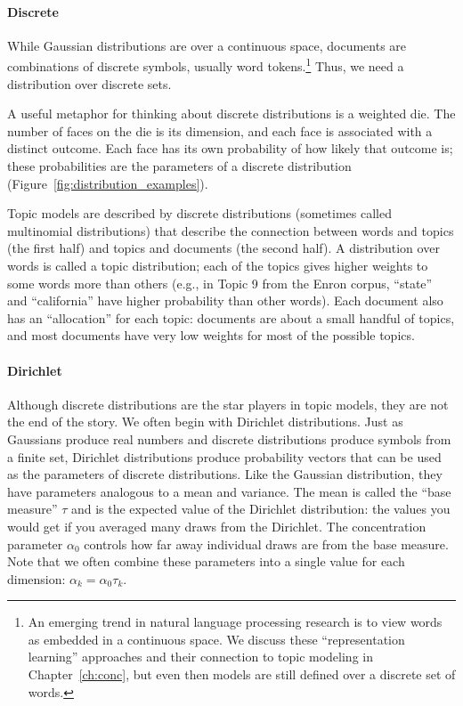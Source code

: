 \paragraph{Discrete}

While Gaussian distributions are over a continuous space, documents are
combinations of discrete symbols, usually word tokens.\footnote{An emerging trend in natural language
  processing research is to view words as embedded in a continuous space. We
  discuss these ``representation learning'' approaches and their connection to
  topic modeling in Chapter~\ref{ch:conc}, but even then models are still defined over a discrete set of words.}   Thus, we need a distribution
over discrete sets.

A useful metaphor for thinking about discrete distributions is a weighted die.
The number of faces on the die is its dimension, and each face is associated with a distinct
outcome.  Each face has its own probability of how likely that outcome is;
these probabilities are the parameters of a discrete distribution
(Figure~\ref{fig:distribution_examples}).

Topic models are described by discrete distributions (sometimes called
multinomial distributions) that describe the connection between words and topics (the first half) and topics and documents (the second half).  A distribution
over words is called a topic distribution; each of the topics gives
higher weights to some words more than others (e.g., in Topic 9 from
the Enron corpus, ``state'' and ``california'' have higher probability
than other words).  Each document also has an ``allocation'' for each
topic: documents are about a small handful of topics, and most
documents have very low weights for most of the possible topics.

\paragraph{Dirichlet}

Although discrete distributions are the star players in topic models, they are
not the end of the story.  We often begin with Dirichlet distributions.
Just as Gaussians produce real numbers and discrete distributions produce symbols from a finite set, Dirichlet distributions produce probability vectors that can be used as the parameters of discrete distributions.
Like the Gaussian distribution, they have parameters analogous to a mean and
variance.  The mean is called the ``base measure'' $\tau$ and is the expected
value of the Dirichlet distribution: the values you would get if you averaged many draws from the
Dirichlet.  The concentration parameter $\alpha_0$ controls how far away individual draws are from the base measure.
Note that we often combine these parameters into a single value for each dimension: $\alpha_k = \alpha_0 \tau_k$.

